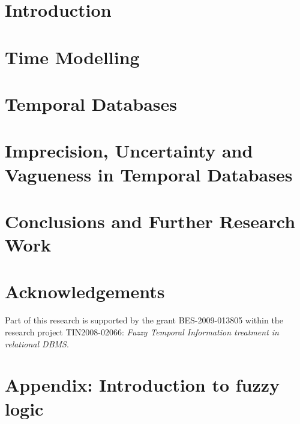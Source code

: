 \documentclass[graybox]{svmult}
\begin{document}
\section{Introduction}
\label{sec:introduction}


\section{Time Modelling}
\label{sec:time-domain}

\def\JPicScale{1}
\section{Temporal Databases}
\label{sec:temporal-databases}

\def\JPicScale{1}
\section{Imprecision, Uncertainty and Vagueness in Temporal Databases}
\label{sec:imprecision-uncertainty}


%
\def\JPicScale{1}
\section{Conclusions and Further Research Work}
\label{sec:further-research-work}

\def\JPicScale{1}
\section*{Acknowledgements}
Part of this research is supported by the grant BES-2009-013805 within the research project TIN2008-02066: \emph{Fuzzy Temporal Information treatment in relational DBMS}.



\def\JPicScale{0.5}


\newpage
\section*{Appendix: Introduction to fuzzy logic}
\label{app:fuzzy-logic}

\end{document}
